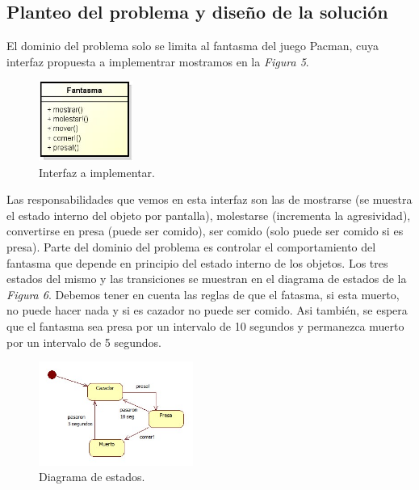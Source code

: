 \documentclass{article}
\begin{document}
\subsection{Planteo del problema y diseño de la solución}

\par
El dominio del problema solo se limita al fantasma del juego Pacman, cuya interfaz propuesta a implementrar mostramos en la  \textit{Figura 5}.
\bigskip

\begin{figure}[h]
	\centering
	\includegraphics[width=0.275\textwidth]{images/ejemplo/Interfaz.jpg}
	\caption{Interfaz a implementar.}
\end{figure}
\bigskip

	Las responsabilidades que vemos en esta interfaz son las de mostrarse (se muestra el estado interno del objeto por pantalla), molestarse (incrementa la agresividad), convertirse en presa (puede ser comido), ser comido (solo puede ser comido si es presa).
Parte del dominio del problema es controlar el comportamiento del fantasma que depende en principio del estado interno de los objetos. Los tres estados del mismo y las transiciones se muestran en el diagrama de estados de la  \textit{Figura 6}. Debemos tener en cuenta las reglas de que el fatasma, si esta muerto, no puede hacer nada y si es cazador no puede ser comido. Asi también, se espera que el fantasma sea presa por un intervalo de 10 segundos y permanezca muerto por un intervalo de 5 segundos.
\bigskip

\begin{figure}[h]
	\centering
	\includegraphics[width=0.45\textwidth]{images/ejemplo/Estados.jpg}
	\caption{Diagrama de estados.}
\end{figure}
\bigskip
\end{document}
